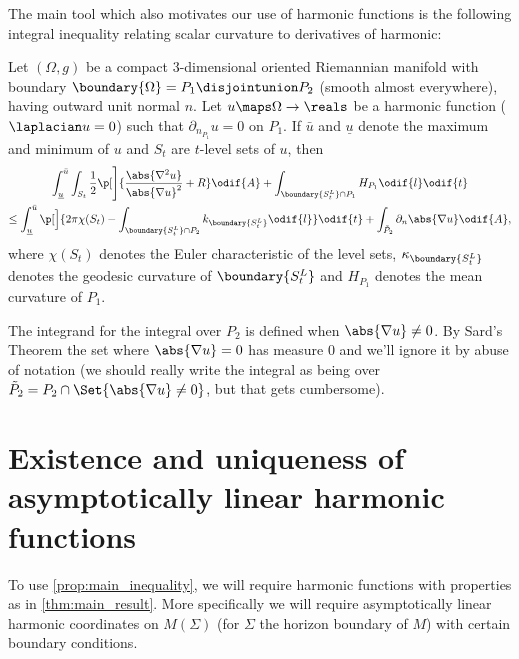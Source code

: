 \documentclass[titlepage,numbers=noenddot,headinclude,oneside,%
footinclude=true,cleardoublepage=empty,%
BCOR=5mm,paper=a4,fontsize=11pt,%
english,%
]{scrartcl}
\begin{document}
The main tool which also motivates our use of harmonic functions is the following integral inequality relating scalar curvature to derivatives of harmonic:
{\newcommand{\maxu}{\bar{u}}
\newcommand{\minu}{\underline{u}}
\newcommand{\nonzeroboundary}{\partial_{\neq 0}\Omega}
\begin{proposition}\label{prop:main_inequality}
    Let \( (\Omega,g) \) be a compact 3-dimensional oriented Riemannian manifold with boundary \( \boundary{\Omega}=P_1\disjointunion P_2 \) (smooth almost everywhere), having outward unit normal \( n \). Let \( u\maps \Omega\to \reals \) be a harmonic function (\ie \( \laplacian u=0 \)) such that \( \partial_{n_{P_1}}u=0 \) on \( P_1 \). If \( \maxu \) and \( \minu \) denote the maximum and minimum of \( u \) and \( S_t \) are \( t \)-level sets of \( u \), then
    \begin{multline*}
        \int_{\minu}^{\maxu} \int_{S_t} \frac{1}{2}\p[\Bigg]{\frac{\abs{\nabla^2 u}}{\abs{\nabla u}^2}+R }\odif{A}+\int_{\boundary{S_t^L}\cap P_1}H_{P_1}\odif{l}\odif{t}\\
        \leq\int_{\minu}^{\maxu}\p[\Big]{2\pi \chi(S_t)-\int _{\boundary{S_t^L} \cap P_2}k_{\boundary{S_t^L}}\odif{l}}\odif{t}+ \int_{\tilde{P}_2}\partial_{n} \abs{\nabla u}\odif{A},
    \end{multline*} 
    where \( \chi(S_t) \) denotes the Euler characteristic of the level sets, \( \kappa_{\boundary{S_t^L}} \) denotes the geodesic curvature of \( \boundary{S_t^L} \) and \( H_{P_1} \) denotes the mean curvature of \( P_1 \).

    The integrand for the integral over \( P_2 \) is defined when \( \abs{\nabla u}\neq 0 \). By Sard's Theorem \parencite{sardMeasureCriticalValues1942} the set where \( \abs{\nabla u}=0 \) has measure \( 0 \) and we'll ignore it by abuse of notation (we should really write the integral as being over \( \tilde{P}_2=P_2\cap \Set{\abs{\nabla u}\neq 0} \), but that gets cumbersome).
\end{proposition}
}
\section{Existence and uniqueness of asymptotically linear harmonic functions}\label{sec:existence_and_uniqueness}
To use \cref{prop:main_inequality}, we will require harmonic functions with properties as in \cref{thm:main_result}. More specifically we will require asymptotically linear harmonic coordinates on \( M(\Sigma) \) (for \( \Sigma \) the horizon boundary of \( M \)) with certain boundary conditions.
\end{document}
